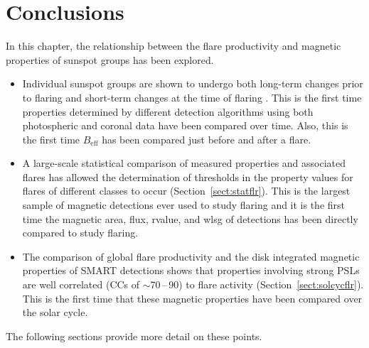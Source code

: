 {%

\section{Conclusions}

In this chapter, the relationship between the flare productivity and magnetic properties of sunspot groups has been explored. 
\begin{itemize}
\item Individual sunspot groups are shown to undergo both long-term changes prior to flaring \citep[Section~\ref{noaa_10365}][]{Verbeeck:2011} and short-term changes at the time of flaring \citep[Section~\ref{sect:noaa_11226}][]{Bloomfield:2012b}. This is the first time properties determined by different detection algorithms using both photospheric and coronal data have been compared over time. Also, this is the first time $B_{\mathrm{eff}}$ has been compared just before and after a flare.
\item A large-scale statistical comparison of measured properties and associated flares has allowed the determination of thresholds in the property values for flares of different classes to occur (Section~\ref{sect:statflr}). This is the largest sample of magnetic detections ever used to study flaring and it is the first time the magnetic area, flux, \gls{rvalue}, and \gls{wlsg} of detections has been directly compared to study flaring. 
\item The comparison of global flare productivity and the disk integrated magnetic properties of \gls{SMART} detections shows that properties involving strong \glspl{PSL} are well correlated (\glspl{CC} of $\sim$70\,--\,90) to flare activity (Section~\ref{sect:solcycflr}). This is the first time that these magnetic properties have been compared over the solar cycle.
\end{itemize}
The following sections provide more detail on these points.

}
